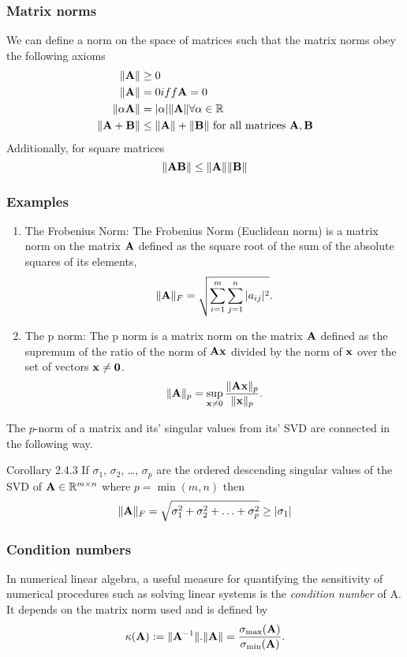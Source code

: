 \documentclass{amsart}[12pt]
\begin{document}
\subsubsection{Matrix norms}
We can define a norm on the space of matrices such that the matrix norms obey the following axioms
\begin{align*}
	\|{\bf A}\|        & \geq 0                                                   \\
	\|{\bf A}\|        & = 0 iff {\bf A} = 0                                          \\
	\|\alpha {\bf A}\| & = |\alpha| \|{\bf A}\| \forall \alpha \in {\mathbb{R}}                 \\
	\|{\bf A} + {\bf B}\|  & \leq \|{\bf A}\| + \|{\bf B}\|\text{ for all matrices } {\bf A}, {\bf B} 
\end{align*}
Additionally, for square matrices
\[
	\|{\bf A}{\bf B}\| \leq \|{\bf A}\| \|{\bf B}\|
\]
\subsubsection{Examples}

\begin{enumerate}
	\item{The Frobenius Norm:}
	The Frobenius Norm (Euclidean norm) is a matrix norm on the matrix ${\bf A}$ defined as the square root of the sum
	of the absolute squares of its elements,
	\[
		\|{\bf A}\|_F = \sqrt{\sum_{i=1}^m \sum_{j=1}^n |a_{ij}|^2}.
	\]
	
	\item{The p norm:}
	The p norm is a matrix norm on the matrix ${\bf A}$ defined as the supremum of the ratio of the norm of
	${\bf A} {\bf x}$ divided by the norm of ${\bf x}$ over the set of vectors ${\bf x} \ne {\bf0}$.
	\[
		\|{\bf A}\|_p = \sup_{{\bf x} \ne 0} \frac{\|{\bf A} {\bf x}\|_p}{\|{\bf x}\|_p}.
	\]
\end{enumerate}

The $p$-norm of a matrix and its' singular values from its' SVD are connected in the following way.

\cite{Golub:1996:MC:248979} Corollary 2.4.3 %
If $\sigma_1$, $\sigma_2$, \ldots, $\sigma_p$ are the ordered descending singular values of the SVD of ${\bf A}
\in {\mathbb{R}}^{m \times n}$ where $p = \min{(m, n)}$ then
\[
	\|{\bf A}\|_F = \sqrt{\sigma_1^2 + \sigma_2^2 + \ldots + \sigma_p^2} \geq |\sigma_1|
\]

\subsubsection{Condition numbers}
In numerical linear algebra, a useful measure for quantifying the sensitivity of numerical procedures such as
solving linear systems is the \emph{condition number} of A. It depends on the matrix norm used and is defined by
\[
	\kappa({\bf A}) := \|{\bf A}^{-1}\|.\|{\bf A}\| = \frac{\sigma_{\text{max}}({\bf A})}{\sigma_{\text{min}}({\bf A})}.
\]
\end{document}
